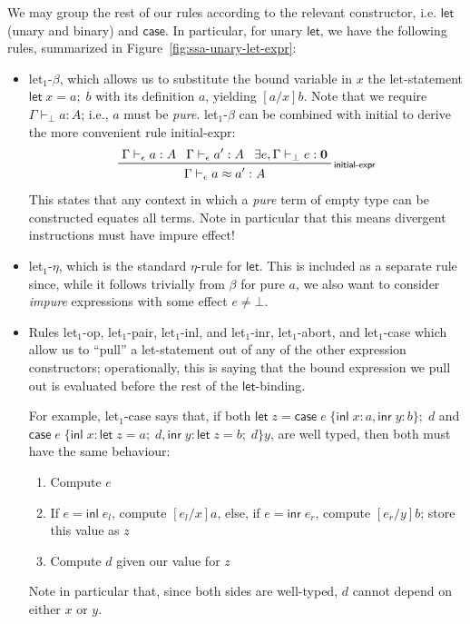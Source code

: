 \documentclass[acmsmall,screen,review]{acmart}
\newcommand{\mb}[1]{\ensuremath{\mathbf{#1}}}
\newcommand{\ms}[1]{\ensuremath{\mathsf{#1}}}
\newcommand{\lto}{:}
\newcommand{\linl}[1]{\ms{inl}\;{#1}}
\newcommand{\linr}[1]{\ms{inr}\;{#1}}
\newcommand{\letexpr}[3]{\ensuremath{\ms{let}\;#1 = #2;\;#3}}
\newcommand{\caseexpr}[5]{\ms{case}\;#1\;\{\linl{#2} \lto #3, \linr{#4} \lto #5\}}
\newcommand{\rle}[1]{{\scriptsize\textsf{#1}}}
\newcommand{\hasty}[4]{#1 \vdash_{#2} #3: {#4}}
\newcommand{\teqv}{\approx}
\newcommand{\tmeq}[5]{#1 \vdash_{#2} #3 \teqv #4 : {#5}}
\newcommand{\brle}[1]{{\scriptsize\textsf{#1}}}
\begin{document}
We may group the rest of our rules according to the relevant constructor, i.e. $\ms{let}$ (unary and
binary) and $\ms{case}$. In particular, for unary $\ms{let}$, we have the following rules,
summarized in Figure~\ref{fig:ssa-unary-let-expr}:
\begin{itemize}
  \item \brle{let$_1$-$\beta$}, which allows us to substitute the bound variable in $x$ the
  let-statement $\letexpr{x}{a}{b}$ with its definition $a$, yielding $[a/x]b$. Note that we require
  $\hasty{\Gamma}{\bot}{a}{A}$; i.e., $a$ must be \emph{pure}.
  \brle{let$_1$-$\beta$} can be combined with \brle{initial} to derive the more convenient
  rule \brle{initial-expr}:
  \begin{gather*}
    \prftree[r]{\rle{initial-expr}} 
      {\hasty{\Gamma}{\epsilon}{a}{A}}
      {\hasty{\Gamma}{\epsilon}{a'}{A}}
      {\exists e, \hasty{\Gamma}{\bot}{e}{\mb{0}}}
      {\tmeq{\Gamma}{\epsilon}{a}{a'}{A}}
  \end{gather*}
  This states that any context in which a \emph{pure} term of empty type can be constructed equates
  all terms. Note in particular that this means divergent instructions must have impure effect!

  \item \brle{let$_1$-$\eta$}, which is the standard $\eta$-rule for \ms{let}. This is included as a
  separate rule since, while it follows trivially from $\beta$ for pure $a$, we also want to
  consider \emph{impure} expressions with some effect $e \neq \bot$.
  
  \item Rules \brle{let$_1$-op}, \brle{let$_1$-pair}, \brle{let$_1$-inl}, and \brle{let$_1$-inr},
  \brle{let$_1$-abort}, and \brle{let$_1$-case} which allow us to ``pull'' a let-statement out of
  any of the other expression constructors; operationally, this is saying that the bound expression
  we pull out is evaluated before the rest of the \ms{let}-binding.
  
  For example, \brle{let$_1$-case} says that, if both
  $\letexpr{z}{\caseexpr{e}{x}{a}{y}{b}}{d}$ and
  $\caseexpr{e}{x}{\letexpr{z}{a}{d}}{y}{\letexpr{z}{b}{d}}{y}$,
  are well typed, then both must have the same behaviour:
  \begin{enumerate}
    \item Compute $e$
    \item If $e = \linl{e_l}$, compute $[e_l/x]a$, else, if $e = \linr{e_r}$, compute $[e_r/y]b$;
          store this value as $z$
    \item Compute $d$ given our value for $z$
  \end{enumerate}
  Note in particular that, since both sides are well-typed, $d$ cannot depend on either $x$ or $y$.
\end{itemize}
\end{document}
